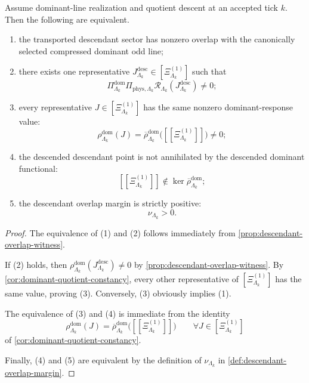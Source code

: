 \documentclass[11pt]{article}
\begin{document}
\begin{proposition}
\label{prop:descendant-overlap-equivalent}
Assume dominant-line realization and quotient descent at an accepted tick \(k\).
Then the following are equivalent.
\begin{enumerate}[leftmargin=2em]
\item the transported descendant sector has nonzero overlap with the canonically selected compressed
  dominant odd line;
\item there exists one representative \(J^{\mathrm{desc}}_{\Lambda_k}\in[\Xi^{(1)}_{\Lambda_k}]\)
  such that
  \[
  \Pi^{\mathrm{dom}}_{\Lambda_k}\Pi_{\mathrm{phys},\Lambda_k}
  \mathcal R_{\Lambda_k}(J^{\mathrm{desc}}_{\Lambda_k})
  \neq 0;
  \]
\item every representative \(J\in[\Xi^{(1)}_{\Lambda_k}]\) has the same nonzero dominant-response
  value:
  \[
  \rho^{\mathrm{dom}}_{\Lambda_k}(J)
  =
  \overline{\rho}^{\mathrm{dom}}_{\Lambda_k}\big([\![\Xi^{(1)}_{\Lambda_k}]\!]\big)
  \neq 0;
  \]
\item the descended descendant point is not annihilated by the descended dominant functional:
  \[
  [\![\Xi^{(1)}_{\Lambda_k}]\!]\notin \ker\overline{\rho}^{\mathrm{dom}}_{\Lambda_k};
  \]
\item the descendant overlap margin is strictly positive:
  \[
  \nu_{\Lambda_k}>0.
  \]
\end{enumerate}
\end{proposition}

\begin{proof}
The equivalence of (1) and (2) follows immediately from
\cref{prop:descendant-overlap-witness}.

If (2) holds, then
\(
\rho^{\mathrm{dom}}_{\Lambda_k}(J^{\mathrm{desc}}_{\Lambda_k})\neq 0
\)
by \cref{prop:descendant-overlap-witness}. By
\cref{cor:dominant-quotient-constancy}, every other representative of
\([\Xi^{(1)}_{\Lambda_k}]\) has the same value, proving (3).
Conversely, (3) obviously implies (1).

The equivalence of (3) and (4) is immediate from the identity
\[
\rho^{\mathrm{dom}}_{\Lambda_k}(J)
=
\overline{\rho}^{\mathrm{dom}}_{\Lambda_k}\big([\![\Xi^{(1)}_{\Lambda_k}]\!]\big)
\qquad
\forall J\in[\Xi^{(1)}_{\Lambda_k}]
\]
of \cref{cor:dominant-quotient-constancy}.

Finally, (4) and (5) are equivalent by the definition of \(\nu_{\Lambda_k}\) in
\cref{def:descendant-overlap-margin}.
\end{proof}
\end{document}
